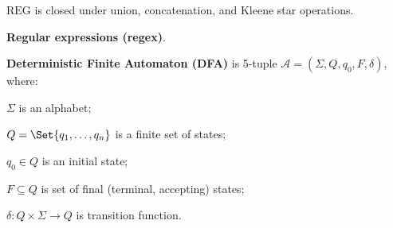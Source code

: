 \documentclass[a4paper,10pt]{article}
\begin{document}
\begin{terms}
    \item $\mathrm{REG}$ is closed under union, concatenation, and Kleene star operations.

    \item \textbf{Regular expressions (regex)}.


    \item \textbf{Deterministic Finite Automaton (DFA)} is 5-tuple $\mathcal{A} = (\Sigma, Q, q_0, F, \delta)$, where:

    \begin{terms}
        \item $\Sigma$ is an alphabet;
        \item $Q = \Set{q_1, \dots, q_n}$ is a finite set of states;
        \item $q_0 \in Q$ is an initial state;
        \item $F \subseteq Q$ is set of final (terminal, accepting) states;
        \item $\delta \colon Q \times \Sigma \to Q$ is transition function.
    \end{terms}


\end{terms}
\end{document}

